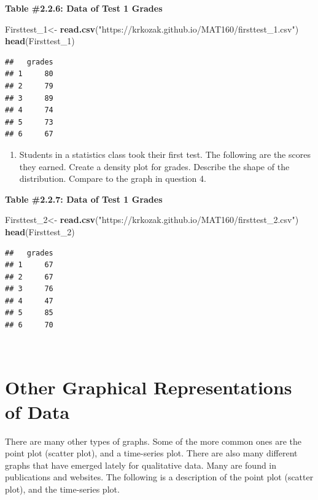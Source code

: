 \documentclass[
]{book}
\newenvironment{Shaded}{\begin{snugshade}}{\end{snugshade}}
\newcommand{\DecValTok}[1]{\textcolor[rgb]{0.00,0.00,0.81}{#1}}
\newcommand{\KeywordTok}[1]{\textcolor[rgb]{0.13,0.29,0.53}{\textbf{#1}}}
\newcommand{\NormalTok}[1]{#1}
\newcommand{\StringTok}[1]{\textcolor[rgb]{0.31,0.60,0.02}{#1}}
\providecommand{\tightlist}{%
  \setlength{\itemsep}{0pt}\setlength{\parskip}{0pt}}
\begin{document}
\textbf{Table \#2.2.6: Data of Test 1 Grades}

\begin{Shaded}
\begin{Highlighting}[]
\NormalTok{Firsttest_}\DecValTok{1}\NormalTok{<-}\StringTok{ }\KeywordTok{read.csv}\NormalTok{(}\StringTok{"https://krkozak.github.io/MAT160/firsttest_1.csv"}\NormalTok{)}
\KeywordTok{head}\NormalTok{(Firsttest_}\DecValTok{1}\NormalTok{)}
\end{Highlighting}
\end{Shaded}

\begin{verbatim}
##   grades
## 1     80
## 2     79
## 3     89
## 4     74
## 5     73
## 6     67
\end{verbatim}

\begin{enumerate}
\def\labelenumi{\arabic{enumi}.}
\setcounter{enumi}{4}
\tightlist
\item
  Students in a statistics class took their first test. The following are the scores they earned. Create a density plot for grades. Describe the shape of the distribution. Compare to the graph in question 4.
\end{enumerate}

\textbf{Table \#2.2.7: Data of Test 1 Grades}

\begin{Shaded}
\begin{Highlighting}[]
\NormalTok{Firsttest_}\DecValTok{2}\NormalTok{<-}\StringTok{ }\KeywordTok{read.csv}\NormalTok{(}\StringTok{"https://krkozak.github.io/MAT160/firsttest_2.csv"}\NormalTok{)}
\KeywordTok{head}\NormalTok{(Firsttest_}\DecValTok{2}\NormalTok{)}
\end{Highlighting}
\end{Shaded}

\begin{verbatim}
##   grades
## 1     67
## 2     67
## 3     76
## 4     47
## 5     85
## 6     70
\end{verbatim}

\emph{\\
}

\hypertarget{other-graphical-representations-of-data}{%
\section{Other Graphical Representations of Data}\label{other-graphical-representations-of-data}}

There are many other types of graphs. Some of the more common ones are the point plot (scatter plot), and a time-series plot. There are also many different graphs that have emerged lately for qualitative data. Many are found in publications and websites. The following is a description of the point plot (scatter plot), and the time-series plot.
\end{document}
